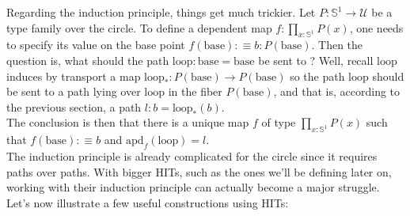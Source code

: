 \documentclass{report}
\begin{document}
Regarding the induction principle, things get much trickier. Let $P : \mathbb{S}^1 \rightarrow \mathcal{U}$ be a type family over the circle. To define a dependent map $f : \prod_{x : \mathbb{S}^1} P(x)$, one needs to specify its value on the base point $f(\mathrm{base}) :\equiv b : P(\mathrm{base})$. Then the question is, what should the path $\mathrm{loop} : \mathrm{base} = \mathrm{base}$ be sent to ? Well, recall $\mathrm{loop}$ induces by transport a map $\mathrm{loop}_* : P(\mathrm{base}) \rightarrow P(\mathrm{base})$ so the path $\mathrm{loop}$ should be sent to a path lying over $\mathrm{loop}$ in the fiber $P(\mathrm{base})$, and that is, according to the previous section, a path $l : b=\mathrm{loop}_*(b)$.\\
The conclusion is then that there is a unique map $f$ of type $\prod_{x : \mathbb{S}^1} P(x)$ such that $f(\mathrm{base}):\equiv b$ and $\mathrm{apd}_f(\mathrm{loop})=l$.\\
The induction principle is already complicated for the circle since it requires paths over paths. With bigger HITs, such as the ones we'll be defining later on, working with their induction principle can actually become a major struggle. Let's now illustrate a few useful constructions using HITs:
\end{document}
